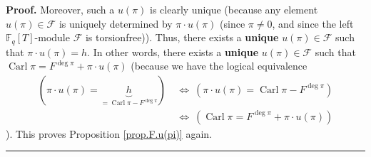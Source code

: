 \documentclass[numbers=enddot,12pt,final,onecolumn,notitlepage]{scrartcl}%
\theoremstyle{definition}
\newenvironment{proof}[1][Proof]{\noindent\textbf{#1.} }{\ \rule{0.5em}{0.5em}}
\begin{document}
\begin{proof}
Moreover, such a $u\left(  \pi\right)  $ is clearly unique (because any
element $u\left(  \pi\right)  \in\mathcal{F}$ is uniquely determined by
$\pi\cdot u\left(  \pi\right)  $ (since $\pi\neq0$, and since the left
$\mathbb{F}_{q}\left[  T\right]  $-module $\mathcal{F}$ is torsionfree)).
Thus, there exists a \textbf{unique} $u\left(  \pi\right)  \in\mathcal{F}$
such that $\pi\cdot u\left(  \pi\right)  =h$. In other words, there exists a
\textbf{unique} $u\left(  \pi\right)  \in\mathcal{F}$ such that
$\operatorname*{Carl}\pi=F^{\deg\pi}+\pi\cdot u\left(  \pi\right)  $ (because
we have the logical equivalence%
\begin{align*}
\left(  \pi\cdot u\left(  \pi\right)  =\underbrace{h}_{=\operatorname*{Carl}%
\pi-F^{\deg\pi}}\right)  \  &  \Longleftrightarrow\ \left(  \pi\cdot u\left(
\pi\right)  =\operatorname*{Carl}\pi-F^{\deg\pi}\right) \\
&  \Longleftrightarrow\ \left(  \operatorname*{Carl}\pi=F^{\deg\pi}+\pi\cdot
u\left(  \pi\right)  \right)
\end{align*}
). This proves Proposition \ref{prop.F.u(pi)} again.
\end{proof}
\end{document}
